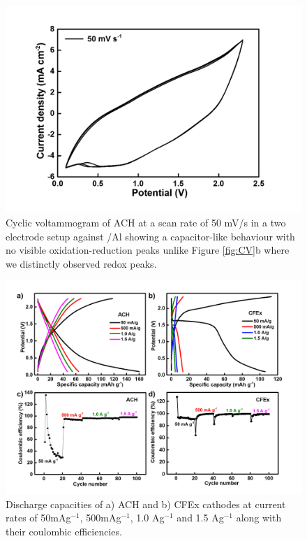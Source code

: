 \documentclass{article}
\begin{document}
\begin{figure}[th!]
\centering
\includegraphics[width=\textwidth]{fig/hair50mVs}
\caption{Cyclic voltammogram of ACH at a scan rate of 50 mV/s in a two electrode setup against /Al showing a capacitor-like behaviour with no visible oxidation-reduction peaks unlike Figure \ref{fig:CV}b where we distinctly observed redox peaks.}
\label{fig:hair50mVs}
\end{figure}

\begin{figure}[h!]
  \centering
  \includegraphics[width=\textwidth]{fig/CFExACHlong}
    \caption{Discharge capacities of a) ACH and b) CFEx cathodes at current rates of 50mAg$^{-1}$, 500mAg$^{-1}$, 1.0 Ag$^{-1}$ and 1.5 Ag$^{-1}$ along with their coulombic efficiencies. }
  \label{fig:CFExACHlong}
\end{figure}
\end{document}
